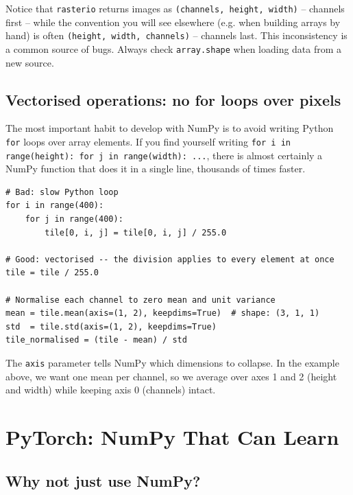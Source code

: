 \documentclass[11pt, a4paper]{article}
\newenvironment{note}{%
  \begin{tcolorbox}[
    colback=notebg, colframe=noteframe,
    fonttitle=\bfseries, title=Note,
    breakable, enhanced
  ]
}{%
  \end{tcolorbox}
}
\begin{document}
\begin{note}
  Notice that \lstinline{rasterio} returns images as
  \lstinline{(channels, height, width)} -- channels first -- while the
  convention you will see elsewhere (e.g. when building arrays by hand) is
  often \lstinline{(height, width, channels)} -- channels last. This
  inconsistency is a common source of bugs. Always check
  \lstinline{array.shape} when loading data from a new source.
\end{note}

\subsection{Vectorised operations: no for loops over pixels}

The most important habit to develop with NumPy is to avoid writing Python
\lstinline{for} loops over array elements. If you find yourself writing
\lstinline{for i in range(height): for j in range(width): ...}, there is
almost certainly a NumPy function that does it in a single line, thousands of
times faster.

\begin{lstlisting}
# Bad: slow Python loop
for i in range(400):
    for j in range(400):
        tile[0, i, j] = tile[0, i, j] / 255.0

# Good: vectorised -- the division applies to every element at once
tile = tile / 255.0

# Normalise each channel to zero mean and unit variance
mean = tile.mean(axis=(1, 2), keepdims=True)  # shape: (3, 1, 1)
std  = tile.std(axis=(1, 2), keepdims=True)
tile_normalised = (tile - mean) / std
\end{lstlisting}

The \lstinline{axis} parameter tells NumPy which dimensions to collapse. In
the example above, we want one mean per channel, so we average over axes 1 and
2 (height and width) while keeping axis 0 (channels) intact.

\section{PyTorch: NumPy That Can Learn}

\subsection{Why not just use NumPy?}
\end{document}
